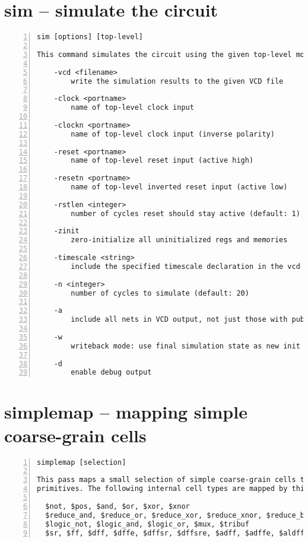 \section{sim -- simulate the circuit}
\label{cmd:sim}
\begin{lstlisting}[numbers=left,frame=single]
    sim [options] [top-level]

This command simulates the circuit using the given top-level module.

    -vcd <filename>
        write the simulation results to the given VCD file

    -clock <portname>
        name of top-level clock input

    -clockn <portname>
        name of top-level clock input (inverse polarity)

    -reset <portname>
        name of top-level reset input (active high)

    -resetn <portname>
        name of top-level inverted reset input (active low)

    -rstlen <integer>
        number of cycles reset should stay active (default: 1)

    -zinit
        zero-initialize all uninitialized regs and memories

    -timescale <string>
        include the specified timescale declaration in the vcd

    -n <integer>
        number of cycles to simulate (default: 20)

    -a
        include all nets in VCD output, not just those with public names

    -w
        writeback mode: use final simulation state as new init state

    -d
        enable debug output
\end{lstlisting}

\section{simplemap -- mapping simple coarse-grain cells}
\label{cmd:simplemap}
\begin{lstlisting}[numbers=left,frame=single]
    simplemap [selection]

This pass maps a small selection of simple coarse-grain cells to yosys gate
primitives. The following internal cell types are mapped by this pass:

  $not, $pos, $and, $or, $xor, $xnor
  $reduce_and, $reduce_or, $reduce_xor, $reduce_xnor, $reduce_bool
  $logic_not, $logic_and, $logic_or, $mux, $tribuf
  $sr, $ff, $dff, $dffe, $dffsr, $dffsre, $adff, $adffe, $aldff, $aldffe, $sdff, $sdffe, $sdffce, $dlatch, $adlatch, $dlatchsr
\end{lstlisting}

